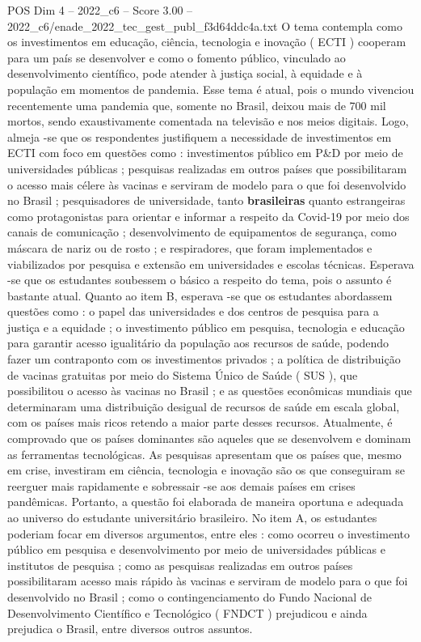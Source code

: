 \begin{textsample}{POS Dim 4 – 2022\_c6 – Score 3.00 – 2022\_c6/enade\_2022\_tec\_gest\_publ\_f3d64ddc4a.txt}
O tema contempla como os investimentos em educação, ciência, tecnologia e inovação ( ECTI ) cooperam para um país se desenvolver e como o fomento público, vinculado ao desenvolvimento científico, pode atender à justiça social, à equidade e à população em momentos de pandemia.
Esse tema é atual, pois o mundo vivenciou recentemente uma pandemia que, somente no Brasil, deixou mais de 700 mil mortos, sendo exaustivamente comentada na televisão e nos meios digitais.
Logo, almeja -se que os respondentes justifiquem a necessidade de investimentos em ECTI com foco em questões como : investimentos público em P\&D por meio de universidades públicas ; pesquisas realizadas em outros países que possibilitaram o acesso mais célere às vacinas e serviram de modelo para o que foi desenvolvido no Brasil ; pesquisadores de universidade, tanto \textbf{brasileiras} quanto estrangeiras como protagonistas para orientar e informar a respeito da Covid-19 por meio dos canais de comunicação ; desenvolvimento de equipamentos de segurança, como máscara de nariz ou de rosto ; e respiradores, que foram implementados e viabilizados por pesquisa e extensão em universidades e escolas técnicas.
Esperava -se que os estudantes soubessem o básico a respeito do tema, pois o assunto é bastante atual.
Quanto ao item B, esperava -se que os estudantes abordassem questões como : o papel das universidades e dos centros de pesquisa para a justiça e a equidade ; o investimento público em pesquisa, tecnologia e educação para garantir acesso igualitário da população aos recursos de saúde, podendo fazer um contraponto com os investimentos privados ; a política de distribuição de vacinas gratuitas por meio do Sistema Único de Saúde ( SUS ), que possibilitou o acesso às vacinas no Brasil ; e as questões econômicas mundiais que determinaram uma distribuição desigual de recursos de saúde em escala global, com os países mais ricos retendo a maior parte desses recursos.
Atualmente, é comprovado que os países dominantes são aqueles que se desenvolvem e dominam as ferramentas tecnológicas.
As pesquisas apresentam que os países que, mesmo em crise, investiram em ciência, tecnologia e inovação são os que conseguiram se reerguer mais rapidamente e sobressair -se aos demais países em crises pandêmicas.
Portanto, a questão foi elaborada de maneira oportuna e adequada ao universo do estudante universitário brasileiro.
No item A, os estudantes poderiam focar em diversos argumentos, entre eles : como ocorreu o investimento público em pesquisa e desenvolvimento por meio de universidades públicas e institutos de pesquisa ; como as pesquisas realizadas em outros países possibilitaram acesso mais rápido às vacinas e serviram de modelo para o que foi desenvolvido no Brasil ; como o contingenciamento do Fundo Nacional de Desenvolvimento Científico e Tecnológico ( FNDCT ) prejudicou e ainda prejudica o Brasil, entre diversos outros assuntos.

\end{textsample}
